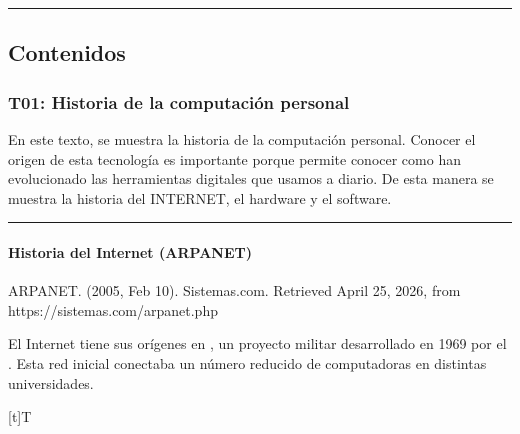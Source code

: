 \documentclass[letterpaper,10pt,spanish]{sphinxmanual}
\let\sphinxpxdimen\pdfpxdimen\else\newdimen\sphinxpxdimen
\begin{document}
\bigskip\hrule\bigskip



\subsection{Contenidos}
\label{\detokenize{cursos/informatica10/recursos/index:contenidos}}
\sphinxstepscope


\subsubsection{T01: Historia de la computación personal}
\label{\detokenize{cursos/informatica10/recursos/T01:t01-historia-de-la-computacion-personal}}\label{\detokenize{cursos/informatica10/recursos/T01::doc}}
\sphinxAtStartPar
En este texto, se muestra la historia de la computación personal. Conocer el origen de esta tecnología es importante porque permite conocer como han evolucionado las herramientas digitales que usamos a diario. De esta manera se muestra la historia del INTERNET, el hardware y el software.


\bigskip\hrule\bigskip



\paragraph{Historia del Internet (ARPANET)}
\label{\detokenize{cursos/informatica10/recursos/T01:historia-del-internet-arpanet}}
\sphinxAtStartPar
%
\begin{footnote}[1]\sphinxAtStartFootnote
ARPANET. (2005, Feb 10). Sistemas.com. Retrieved April 25, 2026, from https://sistemas.com/arpanet.php
%
\end{footnote} El Internet tiene sus orígenes en , un proyecto militar desarrollado en 1969 por el . Esta red inicial conectaba un número reducido de computadoras en distintas universidades.


\begin{savenotes}\sphinxattablestart
\sphinxthistablewithglobalstyle
\centering
\begin{tabulary}{\linewidth}[t]{T}
\sphinxtoprule
\sphinxtableatstartofbodyhook

\begin{sphinxfigure-in-table}
\centering
\capstart
\noindent\sphinxincludegraphics[width=450\sphinxpxdimen]{{image01}.png}
\label{\detokenize{cursos/informatica10/recursos/T01:id26}}\end{sphinxfigure-in-table}\relax
\\
\sphinxbottomrule
\end{tabulary}
\sphinxtableafterendhook\par
\sphinxattableend\end{savenotes}
\end{document}
